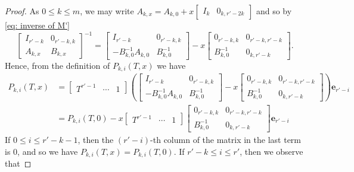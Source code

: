 \documentclass[11pt]{amsart}
\theoremstyle{definition}
\numberwithin{equation}{subsection}
\theoremstyle{plain}
\theoremstyle{plain}
\theoremstyle{plain}
\theoremstyle{plain}
\theoremstyle{plain}
\theoremstyle{plain}
\theoremstyle{plain}
\theoremstyle{plain}
\theoremstyle{plain}
\theoremstyle{plain}
\theoremstyle{plain}
\theoremstyle{plain}
\theoremstyle{definition}
\theoremstyle{definition}
\theoremstyle{definition}
\theoremstyle{remark}
\renewcommand{\(}{\textup{(}}
\renewcommand{\)}{\textup{)}}
\begin{document}
\begin{proof}
As $0\leq k\leq m$, we may write
$  A_{k,x}
    =
    A_{k,0}
    +
    x\begin{bmatrix}
        I_k & 0_{k,r'-2k}
    \end{bmatrix}$
and so by \eqref{eq: inverse of M'}
\begin{equation*}
        \begin{bmatrix}
        I_{r'-k} & 0_{r'-k,k}\\
        A_{k,x} & B_{k,x}
    \end{bmatrix}^{-1}
    =
    \begin{bmatrix}
        I_{r'-k} & 0_{r'-k,k} \\
        -B_{k,0}^{-1}A_{k,0} & B_{k,0}^{-1}
    \end{bmatrix}
    -x
    \begin{bmatrix}
        0_{r'-k,k} & 0_{r'-k,r'-k} \\
        B_{k,0}^{-1}& 0_{k,r'-k}
    \end{bmatrix}.
\end{equation*}
Hence, from the definition of $P_{k,i}(T,x)$ we have
    \begin{align*}
        P_{k,i}(T,x)
        &=
        \begin{bmatrix}
          T^{r'-1} & \cdots & 1
        \end{bmatrix}\left(
        \begin{bmatrix}
            I_{r'-k} & 0_{r'-k,k} \\
            -B_{k,0}^{-1}A_{k,0} & B_{k,0}^{-1}
        \end{bmatrix}
        -x
    \begin{bmatrix}
        0_{r'-k,k} & 0_{r'-k,r'-k} \\
        B_{k,0}^{-1}& 0_{k,r'-k}
    \end{bmatrix}\right)
        \mathbf{e}_{r'-i}
        \\&
        =P_{k,i}(T,0)
        -x\begin{bmatrix}
          T^{r'-1} & \cdots & 1
        \end{bmatrix}
        \begin{bmatrix}
            0_{r'-k,k} & 0_{r'-k,r'-k} \\
            B_{k,0}^{-1}& 0_{k,r'-k}
        \end{bmatrix}
        \mathbf{e}_{r'-i}
    \end{align*}
If $0\leq i\leq r'-k-1$, then the $(r'-i)$-th column of the matrix in the last term is $0$, and so we have $P_{k,i}(T,x)=P_{k,i}(T,0)$. If $r'-k\leq i\leq r'$, then we observe that

\end{proof}
\end{document}
